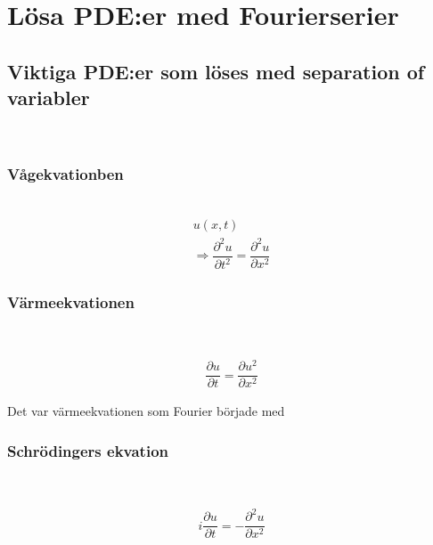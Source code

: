 \section{Lösa PDE:er med Fourierserier}\par
\subsection{Viktiga PDE:er som löses med separation of variabler}\hfill\\\par
\subsubsection{Vågekvationben}\hfill\\
\begin{equation*}
  \begin{gathered}
    u(x,t)\\
    \Rightarrow\dfrac{\partial^2u}{\partial t^2} = \dfrac{\partial^2u}{\partial x^2}
  \end{gathered}
\end{equation*}
\par\bigskip
\subsubsection{Värmeekvationen}\hfill\\\par
\begin{equation*}
  \begin{gathered}
    \dfrac{\partial u}{\partial t} = \dfrac{\partial u^2}{\partial x^2}
  \end{gathered}
\end{equation*}
\par\bigskip
\noindent Det var värmeekvationen som Fourier började med
\par\bigskip
\subsubsection{Schrödingers ekvation}\hfill\\\par
\begin{equation*}
  \begin{gathered}
    i\dfrac{\partial u}{\partial t}=-\dfrac{\partial^2u}{\partial x^2}
  \end{gathered}
\end{equation*}
\par\bigskip
